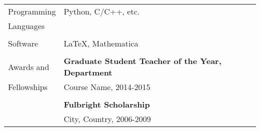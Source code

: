 \begin{tabular}{@{} l l}
  \Large{Programming}   & Python, C/C++, etc. \\
  \Large{Languages}& \\
  &\\
  \Large{Software}    & \LaTeX, Mathematica  \\
  &\\
 \Large{Awards and }    & \textbf{Graduate Student Teacher of the Year, Department} \\
  \Large{Fellowships}   & Course Name, 2014-2015 \\
     & \\
     & \textbf{Fulbright Scholarship} \\
     & City, Country, 2006-2009 \\
\end{tabular}